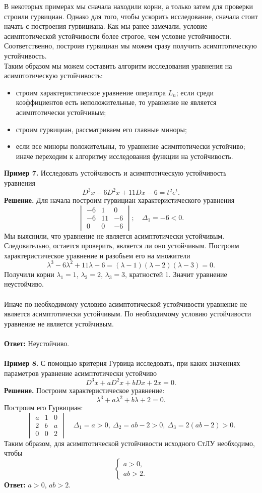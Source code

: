 \documentclass[a4paper, 12pt]{article}
\begin{document}
В некоторых примерах мы сначала находили корни, а только затем для проверки строили гурвициан. Однако для того, чтобы ускорить исследование, сначала стоит начать с построения гурвициана. Как мы ранее замечали, условие асимптотической устойчивости более строгое, чем условие устойчивости. Соответственно, построив гурвициан мы можем сразу получить асимптотическую устойчивость.\\ Таким образом мы можем составить алгоритм исследования уравнения на асимптотическую устойчивость: \begin{itemize}
	\item строим характеристическое уравнение оператора $L_n$; если среди коэффициентов есть неположительные, то уравнение не является асимптотически устойчивым;
	\item строим гурвициан, рассматриваем его главные миноры;
	\item если все миноры положительны, то уравнение асимптотически устойчиво; иначе переходим к алгоритму исследования функции на устойчивость.
\end{itemize}
\textbf{Пример 7.} Исследовать устойчивость и асимптотическую устойчивость уравнения $$D^3x - 6D^2x + 11Dx - 6 = t^2e^t.$$
\textbf{Решение.} Для начала построим гурвициан характеристического уравнения 
$$\begin{vmatrix}
	-6 & 1 & 0\\
	-6 & 11 &-6\\
	0 & 0 & -6
\end{vmatrix};\quad \Delta_1 = -6 < 0.$$
Мы выяснили, что уравнение не является асимптотически устойчивым. Следовательно, остается проверить, является ли оно устойчивым. Построим характеристическое уравнение и разобьем его на множители $$\lambda^3 - 6\lambda^2 + 11\lambda - 6 = (\lambda - 1)(\lambda -2)(\lambda - 3) = 0.$$
Получили корни $\lambda_1 = 1$, $\lambda_2 = 2$, $\lambda_3 = 3$, кратностей 1. Значит уравнение неустойчиво.\\\\
Иначе по необходимому условию асимптотической устойчивости уравнение не является асимптотически устойчивым. По необходимому условию устойчивости уравнение не является устойчивым.\\\\
\textbf{Ответ:} Неустойчиво.\\\\
\textbf{Пример 8.} С помощью критерия Гурвица исследовать, при каких значениях параметров уравнение асимптотически устойчиво
$$D^3x + aD^2x + bDx + 2x = 0.$$
\textbf{Решение.} Построим характеристическое уравнение:
$$\lambda^3 + a\lambda^2 + b\lambda + 2 = 0.$$
Построим его Гурвициан:
$$\begin{vmatrix}
	a & 1 & 0\\
	2 & b & a\\
	0 & 0 & 2
\end{vmatrix}\quad \Delta_1 = a > 0,\ \Delta_2 = ab - 2 > 0,\ \Delta_3 = 2(ab - 2) > 0.$$
Таким образом, для асимптотической устойчивости исходного СтЛУ необходимо, чтобы $$\begin{cases}
	a > 0,\\
	ab > 2.
\end{cases}$$
\textbf{Ответ:} $a > 0$, $ab > 2$.\\\\
\end{document}
